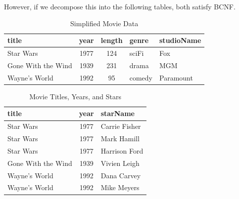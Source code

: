 \documentclass{article}
\begin{document}
    \begin{example}
      However, if we decompose this into the following tables, both satisfy BCNF. 

      \begin{table}[H]
        \centering
        \begin{tabular}{|l|c|c|l|l|}
        \hline
        \textbf{title} & \textbf{year} & \textbf{length} & \textbf{genre} & \textbf{studioName} \\
        \hline
        Star Wars & 1977 & 124 & sciFi & Fox \\
        Gone With the Wind & 1939 & 231 & drama & MGM \\
        Wayne's World & 1992 & 95 & comedy & Paramount \\
        \hline
        \end{tabular}
        \caption{Simplified Movie Data}
        \label{tab:simplemoviedata}
      \end{table}

      \begin{table}[H]
        \centering
        \begin{tabular}{|l|c|l|}
        \hline
        \textbf{title} & \textbf{year} & \textbf{starName} \\
        \hline
        Star Wars & 1977 & Carrie Fisher \\
        Star Wars & 1977 & Mark Hamill \\
        Star Wars & 1977 & Harrison Ford \\
        Gone With the Wind & 1939 & Vivien Leigh \\
        Wayne's World & 1992 & Dana Carvey \\
        Wayne's World & 1992 & Mike Meyers \\
        \hline
        \end{tabular}
        \caption{Movie Titles, Years, and Stars}
        \label{tab:moviestars}
      \end{table}
    \end{example}
\end{document}
